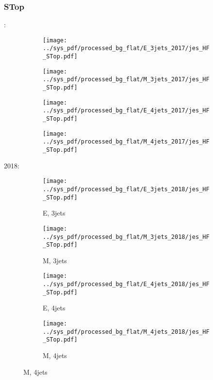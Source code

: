 \documentclass{beamer}
\begin{document}
\begin{frame}
\frametitle{STop}
\fontsize{5}{1}:
\begin{figure}
\centering
\begin{subfigure}[b]{0.24\textwidth}
\texttt{[image: ../sys\_pdf/processed\_bg\_flat/E\_3jets\_2017/jes\_HF\_STop.pdf]}
\end{subfigure}
\begin{subfigure}[b]{0.24\textwidth}
\texttt{[image: ../sys\_pdf/processed\_bg\_flat/M\_3jets\_2017/jes\_HF\_STop.pdf]}
\end{subfigure}
\begin{subfigure}[b]{0.24\textwidth}
\texttt{[image: ../sys\_pdf/processed\_bg\_flat/E\_4jets\_2017/jes\_HF\_STop.pdf]}
\end{subfigure}
\begin{subfigure}[b]{0.24\textwidth}
\texttt{[image: ../sys\_pdf/processed\_bg\_flat/M\_4jets\_2017/jes\_HF\_STop.pdf]}
\end{subfigure}
\end{figure}
2018:
\begin{figure}
\centering
\begin{subfigure}[b]{0.24\textwidth}
\texttt{[image: ../sys\_pdf/processed\_bg\_flat/E\_3jets\_2018/jes\_HF\_STop.pdf]}
\captionsetup{font=tiny}
\caption{E, 3jets}
\end{subfigure}
\begin{subfigure}[b]{0.24\textwidth}
\texttt{[image: ../sys\_pdf/processed\_bg\_flat/M\_3jets\_2018/jes\_HF\_STop.pdf]}
\captionsetup{font=tiny}
\caption{M, 3jets}
\end{subfigure}
\begin{subfigure}[b]{0.24\textwidth}
\texttt{[image: ../sys\_pdf/processed\_bg\_flat/E\_4jets\_2018/jes\_HF\_STop.pdf]}
\captionsetup{font=tiny}
\caption{E, 4jets}
\end{subfigure}
\begin{subfigure}[b]{0.24\textwidth}
\texttt{[image: ../sys\_pdf/processed\_bg\_flat/M\_4jets\_2018/jes\_HF\_STop.pdf]}
\captionsetup{font=tiny}
\caption{M, 4jets}
\end{subfigure}
\end{figure}
\end{frame}
\end{document}

